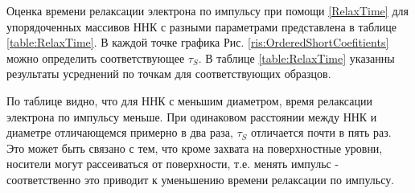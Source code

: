 \documentclass[a4paper,14pt,russian]{extreport}
\begin{document}
				Оценка времени релаксации электрона по импульсу при помощи \ref{RelaxTime} для упорядоченных массивов ННК с разными параметрами представлена в таблице \ref{table:RelaxTime}. В каждой точке графика Рис. \ref{ris:OrderedShortCoefitients} можно определить соответствующее $\tau_S$. В таблице \ref{table:RelaxTime} указанны результаты усреднений по точкам для соответствующих образцов.\par
				По таблице видно, что для ННК с меньшим диаметром, время релаксации электрона по импульсу меньше. При одинаковом расстоянии между ННК и диаметре отличающемся примерно в два раза, $\tau_S$ отличается почти в пять раз. Это может быть связано с тем, что кроме захвата на поверхностные уровни, носители могут рассеиваться от поверхности, т.е. менять импульс - соответственно это приводит к уменьшению времени релаксации по импульсу.\par
\end{document}
